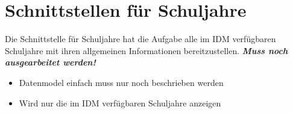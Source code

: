 \section{Schnittstellen für Schuljahre}
Die Schnittstelle für Schuljahre hat die Aufgabe alle im IDM verfügbaren Schuljahre mit ihren allgemeinen Informationen bereitzustellen.
\textbf{\emph{\textcolor[rgb]{1,0,0}{Muss noch ausgearbeitet werden!}}}
\begin{itemize}
	\item Datenmodel einfach muss nur noch beschrieben werden
	\item Wird nur die im IDM verfügbaren Schuljahre anzeigen
\end{itemize}


